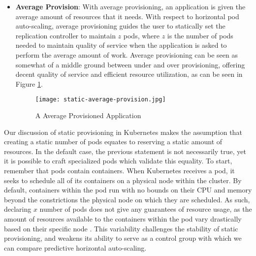 \begin{itemize}
  \item \textbf{Average Provision}: With average provisioning, an application is
    given the average amount of resources that it needs. With respect to
    horizontal pod auto-scaling, average provisioning guides the user to
    statically set the replication controller to maintain $z$ pods, where
    $z$ is the number of pods needed to maintain quality of service when the
    application is asked to perform the average amount of work. Average
    provisioning can be seen as somewhat of a middle ground between under and
    over provisioning, offering decent quality of service and efficient resource
    utilization, as can be seen in Figure \ref{fig:static-average-provision}.

    \begin{figure}[!h]
      \centerline{\texttt{[image: static-average-provision.jpg]}}
      \caption{A Average Provisioned Application}
      \label{fig:static-average-provision}
    \end{figure}
\end{itemize}

Our discussion of static provisioning in Kubernetes makes the assumption that
creating a static number of pods equates to reserving a static amount of
resources. In the default case, the previous statement is not necessarily true,
yet it is possible to craft specialized pods which validate this equality. To
start, remember that pods contain containers. When Kubernetes receives a pod, it
seeks to schedule all of its containers on a physical node within the cluster.
By default, containers within the pod run with no bounds on their CPU and memory
beyond the constrictions the physical node on which they are scheduled. As such,
declaring $x$ number of pods does not give any guarantees of resource usage, as
the amount of resources available to the containers within the pod vary
drastically based on their specific node \cite{k8s-limit-range}. This variability challenges the
stability of static provisioning, and weakens its ability to serve as a control
group with which we can compare predictive horizontal auto-scaling.

